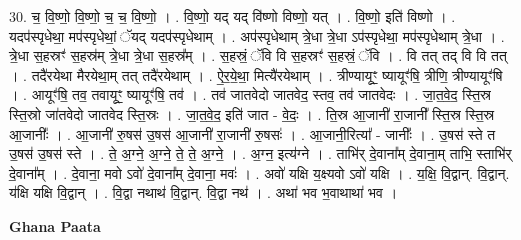 \documentclass[17pt]{extarticle}
\begin{document}
30. च॒ वि॒ष्णो॒ वि॒ष्णो॒ च॒ च॒ वि॒ष्णो॒ । . वि॒ष्णो॒ यद् यद् वि॑ष्णो विष्णो॒ यत् । . वि॒ष्णो॒ इति॑ विष्णो । . यदप॑स्पृधेथा॒ मप॑स्पृधेथां॒ ॅयद् यदप॑स्पृधेथाम् । . अप॑स्पृधेथाम् त्रे॒धा त्रे॒धा ऽप॑स्पृधेथा॒ मप॑स्पृधेथाम् त्रे॒धा । . त्रे॒धा स॒हस्रꣳ॑ स॒हस्र॑म् त्रे॒धा त्रे॒धा स॒हस्र᳚म् । . स॒हस्रं॒ ॅवि वि स॒हस्रꣳ॑ स॒हस्रं॒ ॅवि । . वि तत् तद् वि वि तत् । . तदै॑रयेथा मैरयेथा॒म् तत् तदै॑रयेथाम् । . ऐ॒र॒ये॒था॒ मित्यै॑रयेथाम् । . त्रीण्यायूꣳ॒॒ ष्यायूꣳ॑षि॒ त्रीणि॒ त्रीण्यायूꣳ॑षि । . आयूꣳ॑षि॒ तव॒ तवायूꣳ॒॒ ष्यायूꣳ॑षि॒ तव॑ । . तव॑ जातवेदो जातवेद॒ स्तव॒ तव॑ जातवेदः । . जा॒त॒वे॒द॒ स्ति॒स्र स्ति॒स्रो जा॑तवेदो जातवेद स्ति॒स्रः । . जा॒त॒वे॒द॒ इति॑ जात - वे॒दः॒ । . ति॒स्र आ॒जानी॑ रा॒जानी᳚ स्ति॒स्र स्ति॒स्र आ॒जानीः᳚ । . आ॒जानी॑ रु॒षस॑ उ॒षस॑ आ॒जानी॑ रा॒जानी॑ रु॒षसः॑ । . आ॒जानी॒रित्या᳚ - जानीः᳚ । . उ॒षस॑ स्ते त उ॒षस॑ उ॒षस॑ स्ते । . ते॒ अ॒ग्ने॒ अ॒ग्ने॒ ते॒ ते॒ अ॒ग्ने॒ । . अ॒ग्न॒ इत्य॑ग्ने । . ताभि॑र् दे॒वाना᳚म् दे॒वाना॒म् ताभि॒ स्ताभि॑र् दे॒वाना᳚म् । . दे॒वाना॒ मवो ऽवो॑ दे॒वाना᳚म् दे॒वाना॒ मवः॑ । . अवो॑ यक्षि य॒क्ष्यवो ऽवो॑ यक्षि । . य॒क्षि॒ वि॒द्वान्. वि॒द्वान्. य॑क्षि यक्षि वि॒द्वान् । . वि॒द्वा नथाथ॑ वि॒द्वान्. वि॒द्वा नथ॑ । . अथा॑ भव भ॒वाथाथा॑ भव । \newline

\textbf{Ghana Paata } \newline
\end{document}
